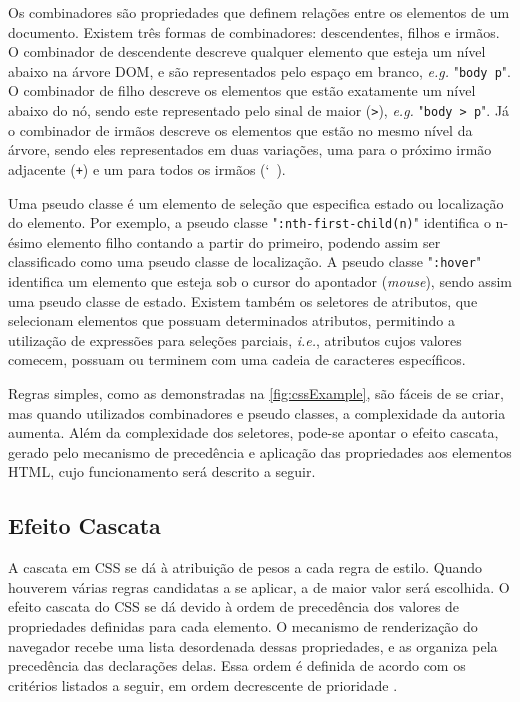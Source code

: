 Os combinadores são propriedades que definem relações entre os elementos de um documento. Existem três formas de combinadores: descendentes, filhos e irmãos. O combinador de descendente descreve qualquer elemento que esteja um nível abaixo na árvore DOM, e são representados pelo espaço em branco, \textit{e.g.} "\texttt{body p}". O combinador de filho descreve os elementos que estão exatamente um nível abaixo do nó, sendo este representado pelo sinal de maior (\texttt{>}), \textit{e.g.} "\texttt{body > p}". Já o combinador de irmãos descreve os elementos que estão no mesmo nível da árvore, sendo eles representados em duas variações, uma para o próximo irmão adjacente (\texttt{+}) e um para todos os irmãos (\char`~).

Uma pseudo classe é um elemento de seleção que especifica estado ou localização do elemento. Por exemplo, a pseudo classe "\texttt{:nth-first-child(n)}" identifica o n-ésimo elemento filho contando a partir do primeiro, podendo assim ser classificado como uma pseudo classe de localização. A pseudo classe "\texttt{:hover}" identifica um elemento que esteja sob o cursor do apontador (\textit{mouse}), sendo assim uma pseudo classe de estado.  Existem também os seletores de atributos, que selecionam elementos que possuam determinados atributos, permitindo a utilização de expressões para seleções parciais, \textit{i.e.}, atributos cujos valores comecem, possuam ou terminem com uma cadeia de caracteres específicos.

Regras simples, como as demonstradas na \autoref{fig:cssExample}, são fáceis de se criar, mas quando utilizados combinadores e pseudo classes, a complexidade da autoria aumenta. Além da complexidade dos seletores, pode-se apontar o efeito cascata, gerado pelo mecanismo de precedência e aplicação das propriedades aos elementos HTML, cujo funcionamento será descrito a seguir.

\subsection{Efeito Cascata}
\label{subsec:cascade}

A cascata em CSS se dá à atribuição de pesos a cada regra de estilo. Quando houverem várias regras candidatas a se aplicar, a de maior valor será escolhida. O efeito cascata do CSS se dá devido à ordem de precedência dos valores de propriedades definidas para cada elemento. O mecanismo de renderização do navegador recebe uma lista desordenada dessas propriedades, e as organiza pela precedência das declarações delas. Essa ordem é definida de acordo com os critérios listados a seguir, em ordem decrescente de prioridade \cite{CSScascade2015}.

